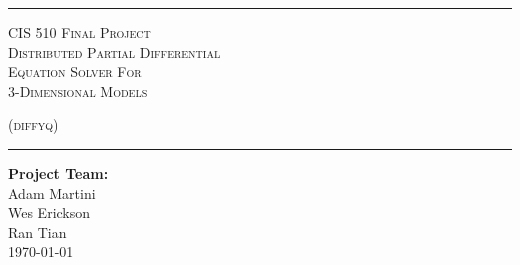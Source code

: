 \begin{titlepage}
\begin{center}

\rule{\linewidth}{0.5mm}

\textsc{\large CIS 510 Final Project}
~\\[1cm]

{\Huge
	\textsc{Distributed Partial Differential \\\vspace{-.2em} Equation Solver For \\\vspace{.3em} 3-Dimensional Models}
}

\vspace{10pt}

\textsc{\Large (diffyq)}

\rule{\linewidth}{0.5mm}

\vfill

\textbf{Project Team:}\\
Adam Martini\\
Wes Erickson\\
Ran Tian\\

\vfill
{\large \today}

\end{center}
\end{titlepage}
